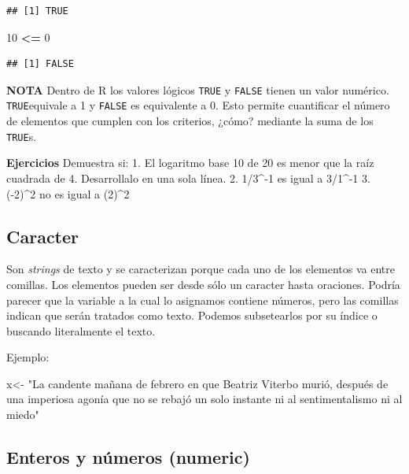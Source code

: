 \documentclass[
]{book}
\newenvironment{Shaded}{\begin{snugshade}}{\end{snugshade}}
\newcommand{\DecValTok}[1]{\textcolor[rgb]{0.00,0.00,0.81}{#1}}
\newcommand{\NormalTok}[1]{#1}
\newcommand{\OtherTok}[1]{\textcolor[rgb]{0.56,0.35,0.01}{#1}}
\newcommand{\SpecialCharTok}[1]{\textcolor[rgb]{0.81,0.36,0.00}{\textbf{#1}}}
\newcommand{\StringTok}[1]{\textcolor[rgb]{0.31,0.60,0.02}{#1}}
\begin{document}
\begin{verbatim}
## [1] TRUE
\end{verbatim}

\begin{Shaded}
\begin{Highlighting}[]
\DecValTok{10} \SpecialCharTok{\textless{}=} \DecValTok{0}   
\end{Highlighting}
\end{Shaded}

\begin{verbatim}
## [1] FALSE
\end{verbatim}

\textbf{NOTA} Dentro de R los valores lógicos \texttt{TRUE} y \texttt{FALSE} tienen un valor numérico. \texttt{TRUE}equivale a 1 y \texttt{FALSE} es equivalente a 0. Esto permite cuantificar el número de elementos que cumplen con los criterios, ¿cómo? mediante la suma de los \texttt{TRUE}s.

\textbf{Ejercicios}
Demuestra si:
1. El logaritmo base 10 de 20 es menor que la raíz cuadrada de 4. Desarrollalo en una sola línea.
2. 1/3\^{}-1 es igual a 3/1\^{}-1
3. (-2)\^{}2 no es igual a (2)\^{}2

\subsection{Caracter}\label{caracter}

Son \emph{strings} de texto y se caracterizan porque cada uno de los elementos va entre comillas. Los elementos pueden ser desde sólo un caracter hasta oraciones.
Podría parecer que la variable a la cual lo asignamos contiene números, pero las comillas indican que serán tratados como texto. Podemos subsetearlos por su índice o buscando literalmente el texto.

Ejemplo:

\begin{Shaded}
\begin{Highlighting}[]
\NormalTok{x}\OtherTok{\textless{}{-}} \StringTok{"La candente mañana de febrero en que Beatriz Viterbo murió, después de una imperiosa agonía que no se rebajó un solo instante ni al sentimentalismo ni al miedo"}
\end{Highlighting}
\end{Shaded}

\subsection{Enteros y números (numeric)}\label{enteros-y-nuxfameros-numeric}
\end{document}
